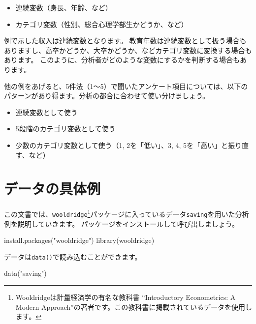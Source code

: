 \documentclass[
]{book}
\newenvironment{Shaded}{\begin{snugshade}}{\end{snugshade}}
\newcommand{\FunctionTok}[1]{\textcolor[rgb]{0.00,0.00,0.00}{#1}}
\newcommand{\NormalTok}[1]{#1}
\newcommand{\StringTok}[1]{\textcolor[rgb]{0.31,0.60,0.02}{#1}}
\providecommand{\tightlist}{%
  \setlength{\itemsep}{0pt}\setlength{\parskip}{0pt}}
\begin{document}
\begin{itemize}
\tightlist
\item
  連続変数（身長、年齢、など）
\item
  カテゴリ変数（性別、総合心理学部生かどうか、など）
\end{itemize}

例で示した収入は連続変数となります。
教育年数は連続変数として扱う場合もありますし、高卒かどうか、大卒かどうか、などカテゴリ変数に変換する場合もあります。
このように、分析者がどのような変数にするかを判断する場合もあります。

他の例をあげると、5件法（1〜5）で聞いたアンケート項目については、以下のパターンがあり得ます。分析の都合に合わせて使い分けましょう。

\begin{itemize}
\tightlist
\item
  連続変数として使う
\item
  5段階のカテゴリ変数として使う
\item
  少数のカテゴリ変数として使う（1, 2を「低い」、3, 4, 5を「高い」と振り直す、など）
\end{itemize}

\hypertarget{ux30c7ux30fcux30bfux306eux5177ux4f53ux4f8b}{%
\section{データの具体例}\label{ux30c7ux30fcux30bfux306eux5177ux4f53ux4f8b}}

この文書では、\texttt{wooldridge}\footnote{Wooldridgeは計量経済学の有名な教科書 ``Introductory Econometrics: A Modern Approach''の著者です。この教科書に掲載されているデータを使用します。}パッケージに入っているデータ\texttt{saving}を用いた分析例を説明していきます。
パッケージをインストールして呼び出しましょう。

\begin{Shaded}
\begin{Highlighting}[]
\FunctionTok{install.packages}\NormalTok{(}\StringTok{"wooldridge"}\NormalTok{)}
\FunctionTok{library}\NormalTok{(wooldridge)}
\end{Highlighting}
\end{Shaded}

データは\texttt{data()}で読み込むことができます。

\begin{Shaded}
\begin{Highlighting}[]
\FunctionTok{data}\NormalTok{(}\StringTok{"saving"}\NormalTok{)}
\end{Highlighting}
\end{Shaded}
\end{document}

